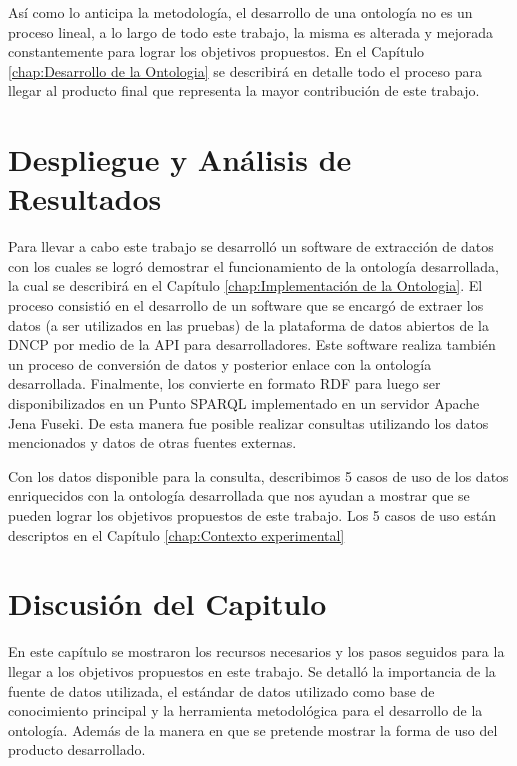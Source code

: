 Así como lo anticipa la metodología, el desarrollo de una ontología no es un proceso lineal, a lo largo de todo este trabajo, la misma es alterada y mejorada constantemente para lograr los objetivos propuestos. En el Capítulo \ref{chap:Desarrollo de la Ontologia} se describirá en detalle todo el proceso para llegar al producto final que representa la mayor contribución de este trabajo.

\section{Despliegue y Análisis de Resultados}
\label{section:despliegue}

Para llevar a cabo este trabajo se desarrolló un software de extracción de datos con los cuales se logró demostrar el funcionamiento de la ontología desarrollada, la cual se describirá en el Capítulo \ref{chap:Implementación de la Ontologia}. El proceso consistió en el desarrollo de un software que se encargó de extraer los datos (a ser utilizados en las pruebas) de la plataforma de datos abiertos de la DNCP por medio de la API para desarrolladores. Este software realiza también un proceso de conversión de datos y posterior enlace con la ontología desarrollada. Finalmente, los convierte en formato RDF para luego ser disponibilizados en un Punto SPARQL implementado en un servidor Apache Jena Fuseki. De esta manera fue posible realizar consultas utilizando los datos mencionados y datos de otras fuentes externas.

Con los datos disponible para la consulta, describimos 5 casos de uso de los datos enriquecidos con la ontología desarrollada que nos ayudan a mostrar que se pueden lograr los objetivos propuestos de este trabajo. Los 5 casos de uso están descriptos en el Capítulo \ref{chap:Contexto experimental}

%

\section{Discusión del Capitulo}

En este capítulo se mostraron los recursos necesarios y los pasos seguidos para la llegar a los objetivos propuestos en este trabajo. Se detalló la importancia de la fuente de datos utilizada, el estándar de datos utilizado como base de conocimiento principal y la herramienta metodológica para el desarrollo de la ontología. Además de la manera en que se pretende mostrar la forma de uso del producto desarrollado.





